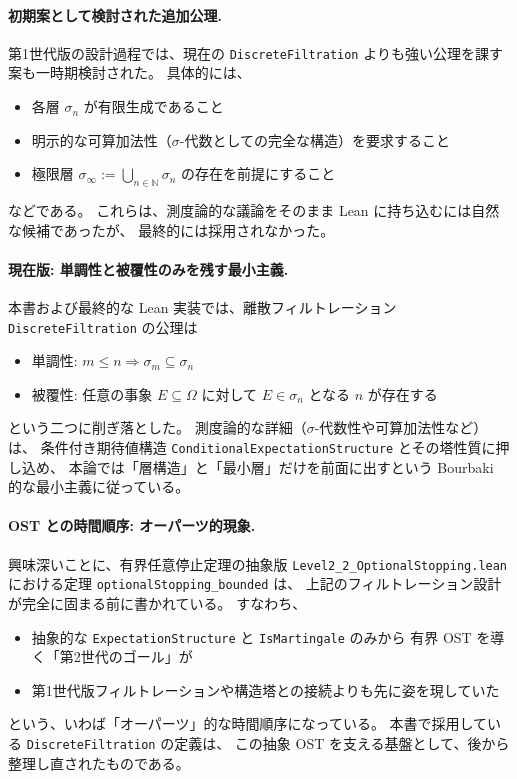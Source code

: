 \documentclass[a4paper,12pt]{ltjsarticle}
\theoremstyle{definition}
\begin{document}
\paragraph{初期案として検討された追加公理.}
第1世代版の設計過程では、現在の \texttt{DiscreteFiltration} よりも強い公理を課す案も一時期検討された。
具体的には、
\begin{itemize}
  \item 各層 $\sigma_n$ が有限生成であること
  \item 明示的な可算加法性（$\sigma$-代数としての完全な構造）を要求すること
  \item 極限層 $\sigma_\infty := \bigcup_{n \in \mathbb{N}} \sigma_n$ の存在を前提にすること
\end{itemize}
などである。
これらは、測度論的な議論をそのまま Lean に持ち込むには自然な候補であったが、
最終的には採用されなかった。

\paragraph{現在版: 単調性と被覆性のみを残す最小主義.}
本書および最終的な Lean 実装では、離散フィルトレーション \texttt{DiscreteFiltration} の公理は
\begin{itemize}
  \item 単調性: $m \le n \Rightarrow \sigma_m \subseteq \sigma_n$
  \item 被覆性: 任意の事象 $E \subseteq \Omega$ に対して $E \in \sigma_n$ となる $n$ が存在する
\end{itemize}
という二つに削ぎ落とした。
測度論的な詳細（$\sigma$-代数性や可算加法性など）は、
条件付き期待値構造 \texttt{ConditionalExpectationStructure} とその塔性質に押し込め、
本論では「層構造」と「最小層」だけを前面に出すという Bourbaki 的な最小主義に従っている。

\paragraph{OST との時間順序: オーパーツ的現象.}
興味深いことに、有界任意停止定理の抽象版
\texttt{Level2\_2\_OptionalStopping.lean} における定理
\texttt{optionalStopping\_bounded} は、
上記のフィルトレーション設計が完全に固まる前に書かれている。
すなわち、
\begin{itemize}
  \item 抽象的な \texttt{ExpectationStructure} と \texttt{IsMartingale} のみから
        有界 OST を導く「第2世代のゴール」が
  \item 第1世代版フィルトレーションや構造塔との接続よりも先に姿を現していた
\end{itemize}
という、いわば「オーパーツ」的な時間順序になっている。
本書で採用している \texttt{DiscreteFiltration} の定義は、
この抽象 OST を支える基盤として、後から整理し直されたものである。
\end{document}
